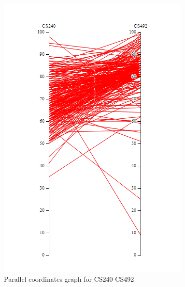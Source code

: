 \begin{figure}[h]
	\centering %
	\includegraphics[width=\columnwidth]{figs/parallel} 
	\caption{Parallel coordinates graph for CS240-CS492}
	\label{fig:sample}
\end{figure}


